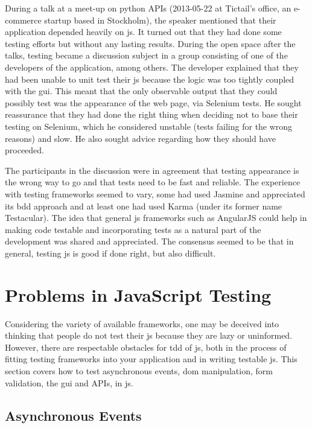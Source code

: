 \documentclass[11pt]{article}
\begin{document}
During a talk at a meet-up on python APIs (2013-05-22 at Tictail's office, an e-commerce startup based in Stockholm), the speaker mentioned that their application depended heavily on \gls{js}. It turned out that they had done some testing efforts but without any lasting results. During the open space after the talks, testing became a discussion subject in a group consisting of one of the developers of the application, among others. The developer explained that they had been unable to unit test their \gls{js} because the logic was too tightly coupled with the \gls{gui}. This meant that the only observable output that they could possibly test was the appearance of the web page, via Selenium tests. He sought reassurance that they had done the right thing when deciding not to base their testing on Selenium, which he considered unstable (tests failing for the wrong reasons) and slow. He also sought advice regarding how they should have proceeded.

The participants in the discussion were in agreement that testing appearance is the wrong way to go and that tests need to be fast and reliable. The experience with testing frameworks seemed to vary, some had used Jasmine and appreciated its \gls{bdd} approach and at least one had used Karma (under its former name Testacular). The idea that general \gls{js} frameworks such as AngularJS could help in making code testable and incorporating tests as a natural part of the development was shared and appreciated. The consensus seemed to be that in general, testing \gls{js} is good if done right, but also difficult.


\section{Problems in JavaScript Testing}
\label{sec:jsproblems}

Considering the variety of available frameworks, one may be deceived into thinking that people do not test their \gls{js} because they are lazy or uninformed. However, there are respectable obstacles for \gls{tdd} of \gls{js}, both in the process of fitting testing frameworks into your application and in writing testable \gls{js}. This section covers how to test asynchronous events, \gls{dom} manipulation, form validation, the \gls{gui} and APIs, in \gls{js}.

\subsection{Asynchronous Events}
\label{subsec:asynchronous}
\end{document}

